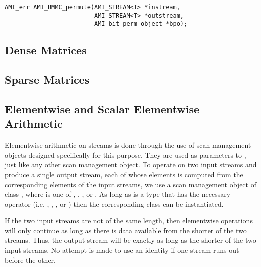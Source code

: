 
\tobeextended

\begin{verbatim}
AMI_err AMI_BMMC_permute(AMI_STREAM<T> *instream, 
                         AMI_STREAM<T> *outstream, 
                         AMI_bit_perm_object *bpo);
\end{verbatim}

\subsection{Dense Matrices}


\tobewritten


\subsection{Sparse Matrices}


\tobewritten

\subsection{Elementwise and Scalar Elementwise Arithmetic}


Elementwise arithmetic on streams is done through the use of scan
management objects designed specifically for this purpose.  They are
used as parameters to , just like any other scan
management object.  To operate on two input streams and produce a
single output stream, each of whose elements is computed from the
corresponding elements of the input streams, we use a scan management
object of class , where  is one of
, , , or .  As long as
 is a type that has the necessary operator (i.e. \myverb{+},
\myverb{-}, \myverb{*}, or \myverb{/}) then the corresponding class
 can be instantiated.

If the two input streams are not of the same length, then elementwise
operations will only continue as long as there is data available from
the shorter of the two streams.  Thus, the output stream will be
exactly as long as the shorter of the two input streams.  No attempt
is made to use an identity if one stream runs out before the other.

